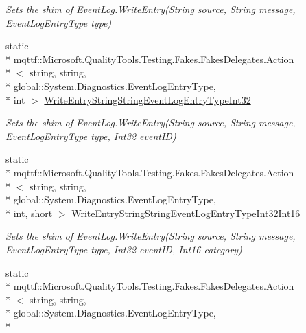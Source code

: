 \begin{DoxyCompactItemize}
\begin{DoxyCompactList}\small\item\em Sets the shim of Event\-Log.\-Write\-Entry(\-String source, String message, Event\-Log\-Entry\-Type type)\end{DoxyCompactList}\item 
static \\*
mqttf\-::\-Microsoft.\-Quality\-Tools.\-Testing.\-Fakes.\-Fakes\-Delegates.\-Action\\*
$<$ string, string, \\*
global\-::\-System.\-Diagnostics.\-Event\-Log\-Entry\-Type, \\*
int $>$ \hyperlink{class_system_1_1_diagnostics_1_1_fakes_1_1_shim_event_log_a5bcb6de42d63157061dda9ff6d81bf8c}{Write\-Entry\-String\-String\-Event\-Log\-Entry\-Type\-Int32}
\begin{DoxyCompactList}\small\item\em Sets the shim of Event\-Log.\-Write\-Entry(\-String source, String message, Event\-Log\-Entry\-Type type, Int32 event\-I\-D)\end{DoxyCompactList}\item 
static \\*
mqttf\-::\-Microsoft.\-Quality\-Tools.\-Testing.\-Fakes.\-Fakes\-Delegates.\-Action\\*
$<$ string, string, \\*
global\-::\-System.\-Diagnostics.\-Event\-Log\-Entry\-Type, \\*
int, short $>$ \hyperlink{class_system_1_1_diagnostics_1_1_fakes_1_1_shim_event_log_a655541342ba3d1b945e93221925b18a5}{Write\-Entry\-String\-String\-Event\-Log\-Entry\-Type\-Int32\-Int16}
\begin{DoxyCompactList}\small\item\em Sets the shim of Event\-Log.\-Write\-Entry(\-String source, String message, Event\-Log\-Entry\-Type type, Int32 event\-I\-D, Int16 category)\end{DoxyCompactList}\item 
static \\*
mqttf\-::\-Microsoft.\-Quality\-Tools.\-Testing.\-Fakes.\-Fakes\-Delegates.\-Action\\*
$<$ string, string, \\*
global\-::\-System.\-Diagnostics.\-Event\-Log\-Entry\-Type, \\*

\end{DoxyCompactItemize}
